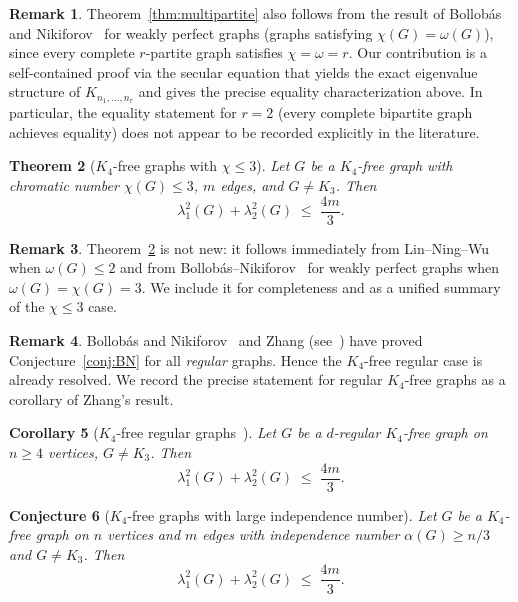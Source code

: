 \documentclass[preprint,12pt]{elsarticle}
\theoremstyle{plain}
\newtheorem{theorem}{Theorem}[section]
\newtheorem{corollary}[theorem]{Corollary}
\newtheorem{conjecture}[theorem]{Conjecture}
\theoremstyle{definition}
\newtheorem{remark}[theorem]{Remark}
\begin{document}
\begin{remark}
  Theorem~\ref{thm:multipartite} also follows from the result of
  Bollob\'as and Nikiforov~\cite{BollobasNikiforov2007} for weakly perfect
  graphs (graphs satisfying $\chi(G) = \omega(G)$), since every complete
  $r$-partite graph satisfies $\chi = \omega = r$.
  Our contribution is a self-contained proof via the secular equation
  that yields the exact eigenvalue structure of $K_{n_1,\ldots,n_r}$
  and gives the precise equality characterization above.
  In particular, the equality statement for $r = 2$ (every complete
  bipartite graph achieves equality) does not appear to be recorded
  explicitly in the literature.
\end{remark}

\begin{theorem}[$K_4$-free graphs with $\chi \leq 3$]
  \label{thm:3colorable}
  Let $G$ be a $K_4$-free graph with chromatic number $\chi(G) \leq 3$,
  $m$ edges, and $G \neq K_3$.  Then
  \[
    \lambda_1^2(G) + \lambda_2^2(G) \;\leq\; \frac{4m}{3}.
  \]
\end{theorem}

\begin{remark}
  Theorem~\ref{thm:3colorable} is not new: it follows immediately from
  Lin--Ning--Wu~\cite{LinNingWu2021} when $\omega(G) \leq 2$ and from
  Bollob\'as--Nikiforov~\cite{BollobasNikiforov2007} for weakly perfect
  graphs when $\omega(G) = \chi(G) = 3$.  We include it for completeness
  and as a unified summary of the $\chi \leq 3$ case.
\end{remark}

\begin{remark}
  Bollob\'as and Nikiforov~\cite{BollobasNikiforov2007} and
  Zhang (see~\cite{ElphickWocjan2014}) have proved Conjecture~\ref{conj:BN}
  for all \emph{regular} graphs.  Hence the $K_4$-free regular case is already
  resolved.  We record the precise statement for regular $K_4$-free graphs
  as a corollary of Zhang's result.
\end{remark}

\begin{corollary}[$K_4$-free regular graphs~\cite{ElphickWocjan2014}]
  \label{cor:regular}
  Let $G$ be a $d$-regular $K_4$-free graph on $n \geq 4$ vertices,
  $G \neq K_3$.  Then
  \[
    \lambda_1^2(G) + \lambda_2^2(G) \;\leq\; \frac{4m}{3}.
  \]
\end{corollary}

\begin{conjecture}[$K_4$-free graphs with large independence number]
  \label{conj:independence}
  Let $G$ be a $K_4$-free graph on $n$ vertices and $m$ edges with
  independence number $\alpha(G) \geq n/3$ and $G \neq K_3$.  Then
  \[
    \lambda_1^2(G) + \lambda_2^2(G) \;\leq\; \frac{4m}{3}.
  \]
\end{conjecture}
\end{document}
